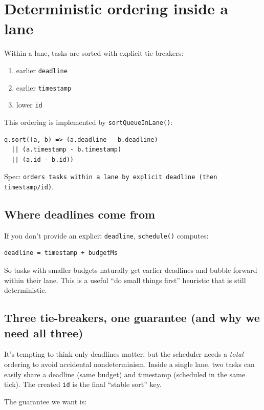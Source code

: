\section{Deterministic ordering inside a lane}

Within a lane, tasks are sorted with explicit tie-breakers:

\begin{enumerate}
  \item earlier \texttt{deadline}
  \item earlier \texttt{timestamp}
  \item lower \texttt{id}
\end{enumerate}

This ordering is implemented by \texttt{sortQueueInLane()}:

\begin{verbatim}
q.sort((a, b) => (a.deadline - b.deadline)
  || (a.timestamp - b.timestamp)
  || (a.id - b.id))
\end{verbatim}

Spec: \texttt{orders tasks within a lane by explicit deadline (then timestamp/id)}.

\subsection{Where deadlines come from}

If you don't provide an explicit \texttt{deadline}, \texttt{schedule()} computes:

\begin{verbatim}
deadline = timestamp + budgetMs
\end{verbatim}

So tasks with smaller budgets naturally get earlier deadlines and bubble forward within their lane.
This is a useful ``do small things first'' heuristic that is still deterministic.

\subsection{Three tie-breakers, one guarantee (and why we need all three)}

It’s tempting to think only deadlines matter, but the scheduler needs a \emph{total} ordering to avoid accidental nondeterminism.
Inside a single lane, two tasks can easily share a deadline (same budget) and timestamp (scheduled in the same tick).
The created \texttt{id} is the final ``stable sort'' key.

The guarantee we want is:

